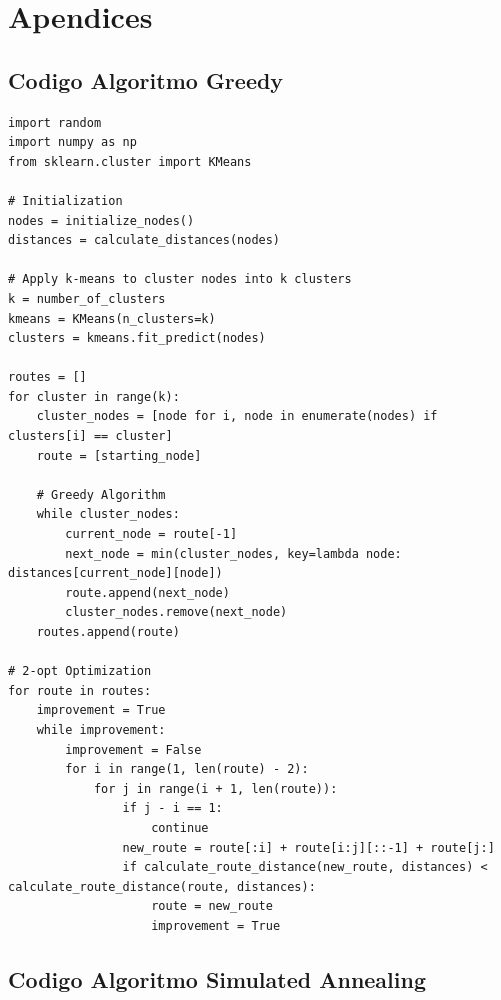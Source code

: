 \documentclass[11pt,a4paper,spanish]{book}
\begin{document}
\chapter{Apendices}

\section{Codigo Algoritmo Greedy}

\lstset{frame=single}
\begin{lstlisting}
import random
import numpy as np
from sklearn.cluster import KMeans

# Initialization
nodes = initialize_nodes()
distances = calculate_distances(nodes)

# Apply k-means to cluster nodes into k clusters
k = number_of_clusters
kmeans = KMeans(n_clusters=k)
clusters = kmeans.fit_predict(nodes)

routes = []
for cluster in range(k):
    cluster_nodes = [node for i, node in enumerate(nodes) if clusters[i] == cluster]
    route = [starting_node]
    
    # Greedy Algorithm
    while cluster_nodes:
        current_node = route[-1]
        next_node = min(cluster_nodes, key=lambda node: distances[current_node][node])
        route.append(next_node)
        cluster_nodes.remove(next_node)
    routes.append(route)

# 2-opt Optimization
for route in routes:
    improvement = True
    while improvement:
        improvement = False
        for i in range(1, len(route) - 2):
            for j in range(i + 1, len(route)):
                if j - i == 1:
                    continue
                new_route = route[:i] + route[i:j][::-1] + route[j:]
                if calculate_route_distance(new_route, distances) < calculate_route_distance(route, distances):
                    route = new_route
                    improvement = True
\end{lstlisting}






\section{Codigo Algoritmo Simulated Annealing}
\end{document}
